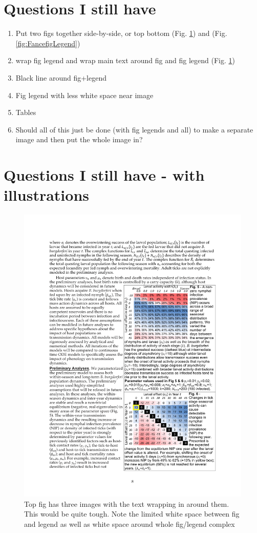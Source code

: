 \documentclass[letterpaper,12pt]{article}%
\begin{document}
\newpage

\section{Questions I still have}
\begin{enumerate}
    \item Put two figs together side-by-side, or top bottom (Fig.  \ref{fig:figLegendWrapWrap}) and (Fig.  \ref{fig:FancefigLegend})
    \item wrap fig legend and wrap main text around fig and fig legend (Fig.  \ref{fig:figLegendWrapWrap})
    \item Black line around fig+legend
    \item Fig legend with less white space near image
    \item Tables
    \item Should all of this just be done (with fig legends and all) to make a separate image and then put the whole image in?
\end{enumerate}

\newpage
\section{Questions I still have - with illustrations}
\begin{figure}[h!]
\centering
\includegraphics[scale=0.7]{FigLegendWrapFigWrap.pdf}
\caption{Top fig has three images with the text wrapping in around them. This would be quite tough. Note the limited white space between fig and legend as well as white space around whole fig/legend complex}
\label{fig:figLegendWrapWrap}
\end{figure}
\end{document}

